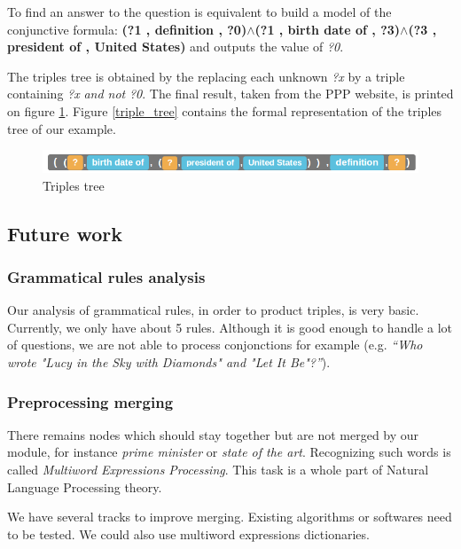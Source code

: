 To find an answer to the question is equivalent to build a model of the conjunctive formula: \textbf{(?1 , definition , ?0)$\wedge$(?1 , birth date of , ?3)$\wedge$(?3 , president of , United States)} and outputs the value of \textit{?0}.

The triples tree is obtained by the replacing each unknown \textit{?x} by a triple containing \textit{?x} \textit{and not} \textit{?0}. The final result, taken from the PPP website, is printed on figure \ref{tree_four}. Figure \ref{triple_tree} contains the formal representation of the triples tree of our example.

\begin{figure}[!h]
  \centering
  \caption{Triples tree}
  \label{tree_four}
    \includegraphics[scale=0.5]{../examples_NLP_classical/final_result.png}
\end{figure}


\subsection{Future work}

\subsubsection{Grammatical rules analysis}

Our analysis of grammatical rules, in order to product triples, is very basic. Currently, we only have about 5 rules. Although it is good enough to handle a lot of questions, we are not able to process conjonctions for example (e.g. \textit{``Who wrote "Lucy in the Sky with Diamonds" and "Let It Be"?''}).

\subsubsection{Preprocessing merging}

There remains nodes which should stay together but are not merged by our module, for instance \emph{prime minister} or \emph{state of the art}. Recognizing such words is called \emph{Multiword Expressions Processing}. This task is a whole part of Natural Language Processing theory. 

We have several tracks to improve merging. Existing algorithms or softwares need to be tested. We could also use multiword expressions dictionaries.

